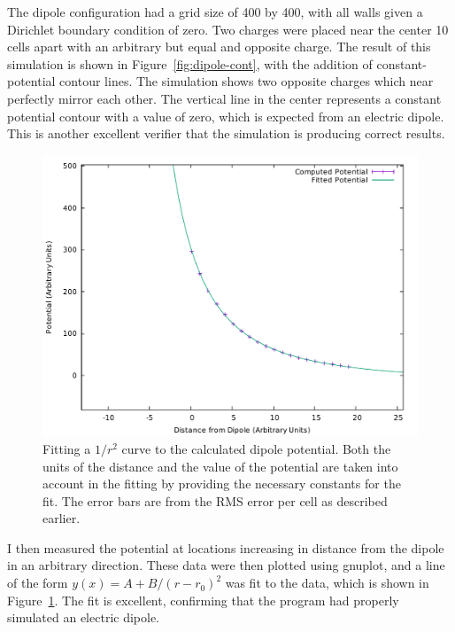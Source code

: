The dipole configuration had a grid size of 400 by 400, with all walls given a Dirichlet boundary condition
of zero. Two charges were placed near the center 10 cells apart with an arbitrary but equal and opposite charge.
The result of this simulation is shown in Figure~\ref{fig:dipole-cont}, with the addition of constant-potential
contour lines. The simulation shows two opposite charges which near perfectly mirror each other. The vertical
line in the center represents a constant potential contour with a value of zero, which is expected from an
electric dipole. This is another excellent verifier that the simulation is producing correct results.

	\begin{figure}[h!]
		\centering
	\includegraphics[width=\linewidth]{dipole_fit.pdf}
		\caption[Fitting a $1/r^2$ curve to the calculated dipole potential.]{Fitting a $1/r^2$ curve to the calculated dipole potential. Both the units of the distance and the value of the potential are taken into account in the fitting by providing
		the necessary constants for the fit. The error bars are from the RMS error per cell as described earlier.} \label{fig:dipole-fit}
	\end{figure}



I then measured the potential at locations increasing in distance from the dipole in an arbitrary direction.
These data were then plotted using gnuplot, and a line of the form $y(x) = A + B / (r-r_0)^2$ was fit to the
data, which is shown in Figure~\ref{fig:dipole-fit}. The fit is excellent, confirming that the program had properly simulated an electric dipole.

